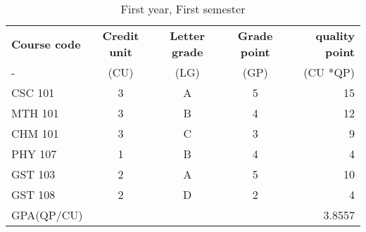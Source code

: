\documentclass{article}
\begin{document}
 
	\begin{table}[h!]
		\begin{center}
	\caption{First year, First semester}
		\label{tab:Table}
			\begin{tabular}{l|c|c|c|r}
				\hline
			\textbf{Course code} & \textbf{Credit unit} & \textbf{Letter grade} & \textbf{Grade point} & \textbf{quality point}\\
			- & (CU) & (LG) & (GP) & (CU *QP)\\
		\hline 
\cellcolor{red!35}CSC 101 &\cellcolor{red!35}3 & \cellcolor{red!35}A & \cellcolor{red!35}5 & \cellcolor{red!35}15\\
	\hline 
\cellcolor{blue!25}MTH 101 & \cellcolor{blue!25}3 & \cellcolor{blue!25}B & \cellcolor{blue!25}4 & \cellcolor{blue!25}12\\
	\hline 
\cellcolor{green!20}CHM 101 & \cellcolor{green!20}3 & \cellcolor{green!20}C & \cellcolor{green!20}3 & \cellcolor{green!20}9\\
	\hline 
\cellcolor{blue!25}PHY 107 & \cellcolor{blue!25}1 & \cellcolor{blue!25}B & \cellcolor{blue!25}4 & \cellcolor{blue!25}4\\
	\hline 
\cellcolor{red!35}GST 103 & \cellcolor{red!35}2 & \cellcolor{red!35}A & \cellcolor{red!35}5 & \cellcolor{red!35}10\\
	\hline 
	\cellcolor{green!20}GST 108 & 	\cellcolor{green!20}2 & 	\cellcolor{green!20}D & 	\cellcolor{green!20}2 & 	\cellcolor{green!20}4\\
		\hline 
	\cellcolor{red!35}GPA(QP/CU) &\cellcolor{red!35} &\cellcolor{red!35} & \cellcolor{red!35}   & \cellcolor{red!35}3.8557\\		
					\hline 
	\end{tabular}	
	\end{center}
\end{table}
\end{document}
